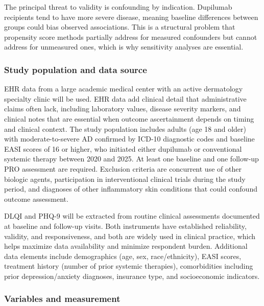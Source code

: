 \documentclass[
]{agujournal2019}
\begin{document}
The principal threat to validity is confounding by indication. Dupilumab
recipients tend to have more severe disease, meaning baseline
differences between groups could bias observed associations. This is a
structural problem that propensity score methods partially address for
measured confounders but cannot address for unmeasured ones, which is
why sensitivity analyses are essential.

\subsubsection{Study population and data
source}\label{study-population-and-data-source}

EHR data from a large academic medical center with an active dermatology
specialty clinic will be used. EHR data add clinical detail that
administrative claims often lack, including laboratory values, disease
severity markers, and clinical notes that are essential when outcome
ascertainment depends on timing and clinical context. The study
population includes adults (age 18 and older) with moderate-to-severe AD
confirmed by ICD-10 diagnostic codes and baseline EASI scores of 16 or
higher, who initiated either dupilumab or conventional systemic therapy
between 2020 and 2025. At least one baseline and one follow-up PRO
assessment are required. Exclusion criteria are concurrent use of other
biologic agents, participation in interventional clinical trials during
the study period, and diagnoses of other inflammatory skin conditions
that could confound outcome assessment.

DLQI and PHQ-9 will be extracted from routine clinical assessments
documented at baseline and follow-up visits. Both instruments have
established reliability, validity, and responsiveness, and both are
widely used in clinical practice, which helps maximize data availability
and minimize respondent burden. Additional data elements include
demographics (age, sex, race/ethnicity), EASI scores, treatment history
(number of prior systemic therapies), comorbidities including prior
depression/anxiety diagnoses, insurance type, and socioeconomic
indicators.

\subsubsection{Variables and
measurement}\label{variables-and-measurement}
\end{document}
